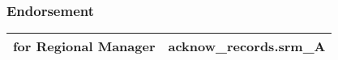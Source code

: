 \subsubsection{Endorsement}
\begin{tabu} to \linewidth { | X[0.4] | X | }
\hline
\textbf{for Regional Manager} & \textbf{ {{ acknow_records.srm_A }} } \\
\hline
\end{tabu}\\%


\clearpage
